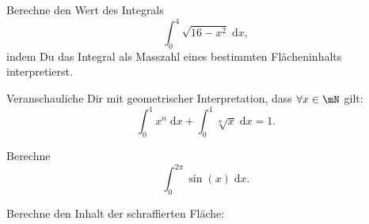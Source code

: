 \documentclass[%
11pt,%
twoside,%
titlepage,%
german,%
headsepline%
]{scrartcl}
\begin{document}
\begin{ueb}[Kreis]
Berechne den Wert des Integrals
$$\int_0^4\sqrt{16-x^2}\;\mathrm{d}x,$$
indem Du das Integral als Masszahl eines bestimmten Flächeninhalts interpretierst.
\end{ueb}

\begin{ueb}[Inverse]
Veranschauliche Dir mit geometrischer Interpretation, dass $\forall x\in\mN$ gilt:
$$\int_0^1x^n\;\mathrm{d}x+\int_0^1\sqrt[n]{x}\;\mathrm{d}x=1.$$
\end{ueb}

\begin{ueb}[sin]
Berechne
$$\int_0^{2\pi}\sin(x)\;\mathrm{d}x.$$
\end{ueb}

\begin{ueb}\label{uebzwischen}
Berechne
den Inhalt der schraffierten Fläche:


\end{ueb}
\end{document}
